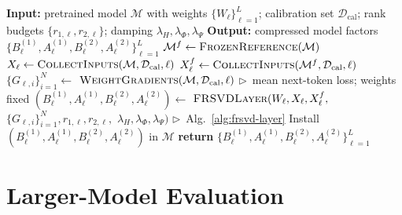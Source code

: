 \begin{algorithm}[t]
\caption{FR-SVD: full compression pipeline}
\label{alg:layerwise}
\small
\begin{algorithmic}[1]
\State \textbf{Input:}\; pretrained model $\mathcal M$
\Statex \hspace{\algorithmicindent} with weights $\{W_\ell\}_{\ell=1}^{L}$;
\Statex \hspace{\algorithmicindent} calibration set $\mathcal D_{\mathrm{cal}}$;
\Statex \hspace{\algorithmicindent} rank budgets $\{r_{1,\ell},r_{2,\ell}\}$;
\Statex \hspace{\algorithmicindent} damping $\lambda_H,\lambda_\Phi,\lambda_\Psi$
\State \textbf{Output:}\; compressed model factors
\Statex \hspace{\algorithmicindent} $\{B_\ell^{(1)},A_\ell^{(1)},B_\ell^{(2)},A_\ell^{(2)}\}_{\ell=1}^{L}$
\State $\mathcal M^f\gets\textsc{FrozenReference}(\mathcal M)$
    \State $X_\ell\gets\Call{CollectInputs}{\mathcal M,\mathcal D_{\mathrm{cal}},\ell}$
    \State $X_\ell^f\gets\Call{CollectInputs}{\mathcal M^f,\mathcal D_{\mathrm{cal}},\ell}$
    \State $\{G_{\ell,i}\}_{i=1}^N \gets$
    \Statex \hspace{\algorithmicindent} $\Call{WeightGradients}{\mathcal M,\mathcal D_{\mathrm{cal}},\ell}$
    \Statex \hspace{\algorithmicindent} $\triangleright$~mean next-token loss; weights fixed
    \State $(B_\ell^{(1)},A_\ell^{(1)},B_\ell^{(2)},A_\ell^{(2)})\gets$
    \Statex \hspace{\algorithmicindent} $\textsc{FRSVDLayer}(W_\ell,X_\ell,X_\ell^f,$
    \Statex \hspace{\dimexpr\algorithmicindent+\algorithmicindent\relax} $\{G_{\ell,i}\}_{i=1}^N,r_{1,\ell},r_{2,\ell},$
    \Statex \hspace{\dimexpr\algorithmicindent+\algorithmicindent\relax} $\lambda_H,\lambda_\Phi,\lambda_\Psi)$
    \Statex \hspace{\algorithmicindent} $\triangleright$~Alg.~\ref{alg:frsvd-layer}
    \State Install $(B_\ell^{(1)},A_\ell^{(1)},B_\ell^{(2)},A_\ell^{(2)})$ in $\mathcal M$
\EndFor
\State \textbf{return} $\{B_\ell^{(1)}, A_\ell^{(1)}, B_\ell^{(2)}, A_\ell^{(2)}\}_{\ell=1}^{L}$
\end{algorithmic}
\end{algorithm}

\section{Larger-Model Evaluation}\label{app:full-results}\label{app:large-models}

